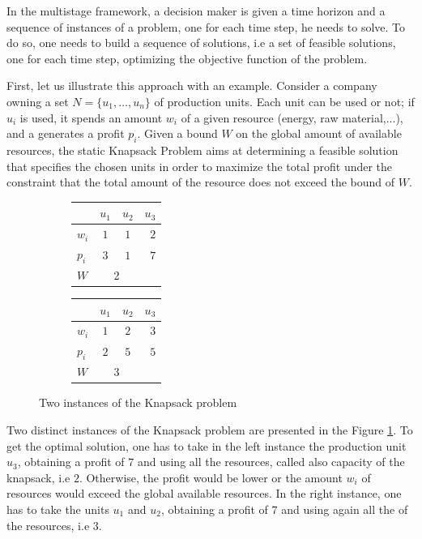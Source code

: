 \documentclass[a4paper]{book}
\begin{document}
In the multistage framework, a decision maker is given a time horizon and a sequence of instances of a problem, one for each time step, he needs to solve. To do so, one needs to build a sequence of solutions, i.e a set of feasible solutions, one for each time step, optimizing the objective function of the problem. 

First, let us illustrate this approach with an example. Consider a company owning a set $N=\{u_1,\ldots,u_n\}$ of production units. Each unit can be used or not; if $u_i$ is used, it spends an amount $w_i$ of a given resource (energy, raw material,...), and a generates a profit $p_i$. Given a bound $W$ on the global amount of available resources, the static {\sc Knapsack Problem} aims at determining a feasible solution that specifies the chosen units in order to maximize the total profit under the constraint that the total amount of the resource does not exceed the bound of $W$.

\begin{figure}[h]
\centering
\begin{subfigure}[b]{0.4\textwidth}
\begin{tabular}{|l|c|c|r|}
  \hline
   &$u_1$&$u_2$&$u_3$ \\
  \hline
 $w_{i}$ & $1$ & $1$ & $2$\\
    \hline
  $p_{i} $& $3$ & $1$ & $7$\\
  \hline
  $W$ & \multicolumn{2}{c}{\text{   }2} &\\
  \hline
\end{tabular}
\end{subfigure}
\begin{subfigure}[b]{0.4\textwidth}
\begin{tabular}{|l|c|c|r|}
  \hline
   &$u_1$&$u_2$&$u_3$ \\
  \hline
 $w_{i}$ & $1$ & $2$ & $3$\\
    \hline
  $p_{i} $& $2$ & $5$ & $5$\\
  \hline
   $W$ & \multicolumn{2}{c}{\text{     }3} &\\
  \hline
\end{tabular}
\end{subfigure}
\caption{Two instances of the {\sc Knapsack} problem}
\label{statickp}
\end{figure}

Two distinct instances of the {\sc Knapsack} problem are presented in the Figure \ref{statickp}. To get the optimal solution, one has to take in the left instance the production unit $u_3$, obtaining a profit of $7$ and using all the resources, called also capacity of the knapsack, i.e $2$. Otherwise, the profit would be lower or the amount $w_i$ of resources would exceed the global available resources. In the right instance, one has to take the units $u_1$ and $u_2$, obtaining a profit of $7$ and using again all the of the resources, i.e $3$.\\
\end{document}

